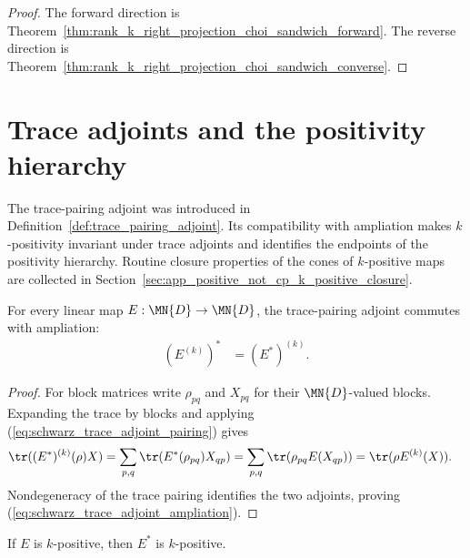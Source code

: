 \begin{proof}
    \leanok
    The forward direction is
    Theorem~\ref{thm:rank_k_right_projection_choi_sandwich_forward}. The
    reverse direction is
    Theorem~\ref{thm:rank_k_right_projection_choi_sandwich_converse}.
\end{proof}

\section{Trace adjoints and the positivity hierarchy}

The trace-pairing adjoint was introduced in
Definition~\ref{def:trace_pairing_adjoint}. Its compatibility with
ampliation makes $k$-positivity invariant under trace adjoints and identifies
the endpoints of the positivity hierarchy. Routine closure properties of the
cones of $k$-positive maps are collected in
Section~\ref{sec:app_positive_not_cp_k_positive_closure}.

\begin{theorem}
    \label{thm:trace_pairing_adjoint_ampliation}
    \leanok
    For every linear map $E : \MN{D}\to\MN{D}$, the trace-pairing adjoint
    commutes with ampliation:
    \begin{align}
        (E^{(k)})^*
         & =(E^*)^{(k)}.
        \label{eq:schwarz_trace_adjoint_ampliation}
    \end{align}
\end{theorem}

\begin{proof}
    \leanok
    For block matrices write $\rho_{pq}$ and $X_{pq}$ for their
    $\MN{D}$-valued blocks. Expanding the trace by blocks and applying
    (\ref{eq:schwarz_trace_adjoint_pairing}) gives
    \begin{align}
        \tr((E^*)^{(k)}(\rho)X)
         & =\sum_{p,q}\tr(E^*(\rho_{pq})X_{qp})
        =\sum_{p,q}\tr(\rho_{pq}E(X_{qp}))
        =\tr(\rho E^{(k)}(X)).
        \notag
    \end{align}
    Nondegeneracy of the trace pairing identifies the two adjoints, proving
    (\ref{eq:schwarz_trace_adjoint_ampliation}).
\end{proof}

\begin{theorem}
    \label{thm:k_positive_trace_pairing_adjoint}
    \leanok
    If $E$ is $k$-positive, then $E^*$ is $k$-positive.
\end{theorem}

